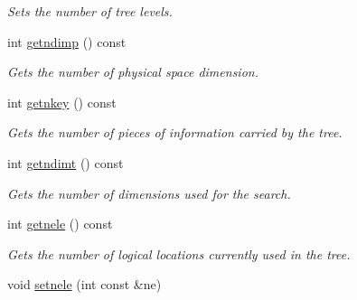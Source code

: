 \begin{DoxyCompactItemize}
\begin{DoxyCompactList}\small\item\em Sets the number of tree levels. \item\end{DoxyCompactList}\item 
\hypertarget{classTree__Header_a7f2d1853d95363ac137b9f942a81a318}{
int \hyperlink{classTree__Header_a7f2d1853d95363ac137b9f942a81a318}{getndimp} () const }
\label{classTree__Header_a7f2d1853d95363ac137b9f942a81a318}

\begin{DoxyCompactList}\small\item\em Gets the number of physical space dimension. \item\end{DoxyCompactList}\item 
\hypertarget{classTree__Header_ad5ee863231e81dc6d388bc183c5b35f1}{
int \hyperlink{classTree__Header_ad5ee863231e81dc6d388bc183c5b35f1}{getnkey} () const }
\label{classTree__Header_ad5ee863231e81dc6d388bc183c5b35f1}

\begin{DoxyCompactList}\small\item\em Gets the number of pieces of information carried by the tree. \item\end{DoxyCompactList}\item 
\hypertarget{classTree__Header_a5a6166156d8b01a0847cebab161eab59}{
int \hyperlink{classTree__Header_a5a6166156d8b01a0847cebab161eab59}{getndimt} () const }
\label{classTree__Header_a5a6166156d8b01a0847cebab161eab59}

\begin{DoxyCompactList}\small\item\em Gets the number of dimensions used for the search. \item\end{DoxyCompactList}\item 
\hypertarget{classTree__Header_a2c3816734f8e1269250d4c68fe7acf46}{
int \hyperlink{classTree__Header_a2c3816734f8e1269250d4c68fe7acf46}{getnele} () const }
\label{classTree__Header_a2c3816734f8e1269250d4c68fe7acf46}

\begin{DoxyCompactList}\small\item\em Gets the number of logical locations currently used in the tree. \item\end{DoxyCompactList}\item 
\hypertarget{classTree__Header_ad403a6445724b73435247700a2204a7c}{
void \hyperlink{classTree__Header_ad403a6445724b73435247700a2204a7c}{setnele} (int const \&ne)}
\label{classTree__Header_ad403a6445724b73435247700a2204a7c}


\end{DoxyCompactItemize}
